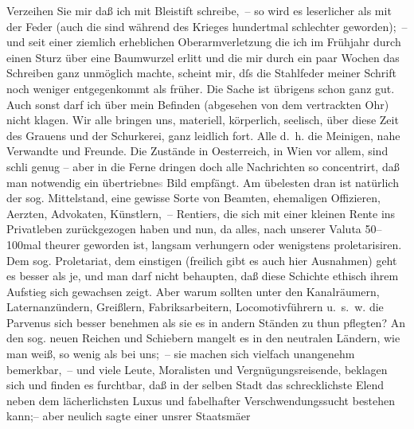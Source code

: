 \pstart
           Verzeihen Sie mir daß ich mit Bleistift schreibe, – so wird es leserlicher als mit
               der Feder (auch die sind während des Krieges hundertmal schlechter geworden); – und
               seit einer ziemlich erheblichen Oberarmverletzung die ich im Frühjahr durch einen
               Sturz über eine Baumwurzel erlitt und die mir durch ein paar Wochen das Schreiben
               ganz unmöglich machte, scheint mir, dſs die Stahlfeder meiner Schrift noch weniger
               entgegenkommt als früher. Die Sache ist übrigens schon ganz gut. Auch sonst darf ich
               über mein Befinden (abgesehen von dem vertrackten Ohr) nicht klagen. Wir alle bringen
               uns, materiell, körperlich, seelisch, über diese Zeit des Grauens und der Schurkerei,
               ganz leidlich fort. Alle {\dotstwo} d. h. die {\pb}Meinigen, nahe Verwandte und Freunde. Die Zustände
               in Oesterreich, in Wien vor allem, sind schli{\geminationm} genug –
               aber in die Ferne dringen doch alle Nachrichten so concentrirt, daß man notwendig ein
                  übertriebne\textcolor{gray}{s} Bild empfängt. Am übelesten \introOben{}dran\introOben{} ist natürlich der sog. Mittelstand, eine gewisse Sorte von Beamten,
               ehemaligen Offizieren, Aerzten, Advokaten, Künstlern, – Rentiers, die sich mit einer
               kleinen Rente ins Privatleben zurückgezogen haben und nun, da alles, nach unserer
               Valuta 50–100mal theurer geworden ist, langsam verhungern oder wenigstens
               proletarisiren. Dem sog. Proletariat, dem einstigen (freilich gibt es auch hier
               Ausnahmen) geht es besser als je, und man darf nicht behaupten, daß diese Schichte
               ethisch ihrem Aufstieg sich gewachsen zeigt. Aber \introOben{}warum\introOben{}
               sollten unter den Kanalräumern, Laternanzündern, Greißlern, Fabriksarbeitern,
               Locomotivführern u. s. w. die Parvenus sich besser benehmen als sie es in andern
               Ständen zu thun pflegten? {\pb}An den sog. neuen
               Reichen und Schiebern mangelt es in den neutralen Ländern, wie man weiß, so wenig als
               bei uns; – sie machen sich vielfach unangenehm bemerkbar, – und viele Leute,
               Moralisten und Vergnügungsreisende, beklagen sich und finden es furchtbar, daß in der
               selben Stadt das schrecklichste Elend neben dem lächerlichsten Luxus und fabelhafter
               Verschwendungssucht bestehen kann;– aber neulich sagte einer unsrer Staatsmä{\geminationn}er
